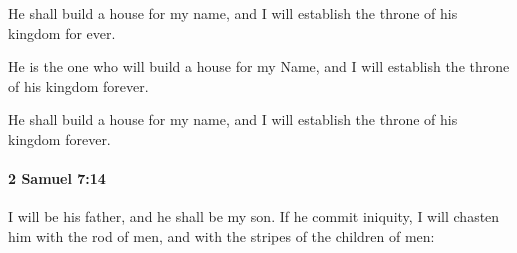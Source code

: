 			\begin{versebox}
					\item[BHS] 
					\item[ASV] He shall build a house for my name, and I will establish the throne of his kingdom for ever.
					\item[NIV] He is the one who will build a house for my Name, and I will establish the throne of his kingdom forever.
					\item[NRSV] He shall build a house for my name, and I will establish the throne of his kingdom forever.
			\end{versebox}

		\paragraph{2 Samuel 7:14} %
			\label{2SAMUEL-7-14}

			I will be his father, and he shall be my son. If he commit iniquity, I will chasten him with the rod of men, and with the stripes of the children of men:

